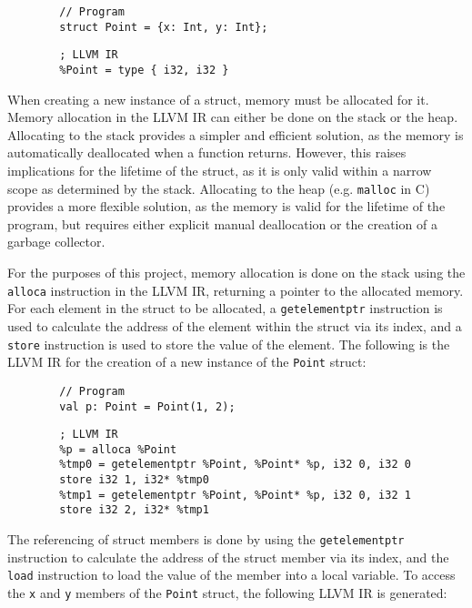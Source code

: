\begin{tcolorbox}[sidebyside]
    \begin{verbatim}
        // Program
        struct Point = {x: Int, y: Int};
    \end{verbatim}
    \tcblower
    \begin{verbatim}
        ; LLVM IR
        %Point = type { i32, i32 }
    \end{verbatim}
\end{tcolorbox}

When creating a new instance of a struct, memory must be allocated for it. Memory allocation in the
LLVM IR can either be done on the stack or the heap. Allocating to the stack provides a simpler and
efficient solution, as the memory is automatically deallocated when a function returns. However,
this raises implications for the lifetime of the struct, as it is only valid within a narrow scope
as determined by the stack. Allocating to the heap (e.g. \texttt{malloc} in C) provides a more
flexible solution, as the memory is valid for the lifetime of the program, but requires either
explicit manual deallocation or the creation of a garbage collector.

For the purposes of this project, memory allocation is done on the stack using the \texttt{alloca}
instruction in the LLVM IR, returning a pointer to the allocated memory. For each element in the
struct to be allocated, a \texttt{getelementptr} instruction is used to calculate the address of the
element within the struct via its index, and a \texttt{store} instruction is used to store the value
of the element. The following is the LLVM IR for the creation of a new instance of the
\texttt{Point} struct:

\begin{tcolorbox}
    \begin{verbatim}
        // Program
        val p: Point = Point(1, 2);
    \end{verbatim}
    \tcblower
    \begin{verbatim}
        ; LLVM IR
        %p = alloca %Point
        %tmp0 = getelementptr %Point, %Point* %p, i32 0, i32 0
        store i32 1, i32* %tmp0
        %tmp1 = getelementptr %Point, %Point* %p, i32 0, i32 1
        store i32 2, i32* %tmp1
    \end{verbatim}
\end{tcolorbox}

The referencing of struct members is done by using the \texttt{getelementptr} instruction to
calculate the address of the struct member via its index, and the \texttt{load} instruction to load
the value of the member into a local variable. To access the \texttt{x} and \texttt{y} members of
the \texttt{Point} struct, the following LLVM IR is generated:

